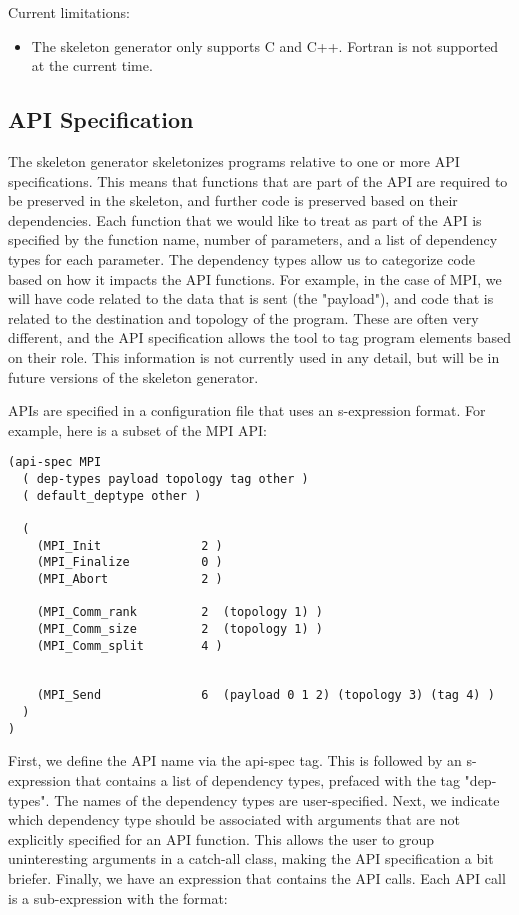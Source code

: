 \documentclass{article}
\begin{document}
Current limitations:

\begin{itemize}

\item The skeleton generator only supports C and C++.
    Fortran is not supported at the current time.

\end{itemize}

\subsection{API Specification}

The skeleton generator skeletonizes programs relative to one or more
API specifications.  This means that functions that are part of the
API are required to be preserved in the skeleton, and further code is
preserved based on their dependencies.  Each function that we would
like to treat as part of the API is specified by the function name,
number of parameters, and a list of dependency types for each
parameter.  The dependency types allow us to categorize code based on
how it impacts the API functions.  For example, in the case of MPI, we
will have code related to the data that is sent (the "payload"), and
code that is related to the destination and topology of the program.
These are often very different, and the API specification allows the
tool to tag program elements based on their role.  This information is
not currently used in any detail, but will be in future versions of
the skeleton generator.

APIs are specified in a configuration file that uses an s-expression
format.  For example, here is a subset of the MPI API:

\begin{verbatim}
(api-spec MPI
  ( dep-types payload topology tag other )
  ( default_deptype other )

  (
    (MPI_Init              2 )
    (MPI_Finalize          0 )
    (MPI_Abort             2 )

    (MPI_Comm_rank         2  (topology 1) )
    (MPI_Comm_size         2  (topology 1) )
    (MPI_Comm_split        4 )


    (MPI_Send              6  (payload 0 1 2) (topology 3) (tag 4) )
  )
)
\end{verbatim}

First, we define the API name via the api-spec tag.  This is followed
by an s-expression that contains a list of dependency types, prefaced
with the tag "dep-types".  The names of the dependency types are
user-specified.  Next, we indicate which dependency type should be
associated with arguments that are not explicitly specified for an API
function.  This allows the user to group uninteresting arguments in a
catch-all class, making the API specification a bit briefer.  Finally,
we have an expression that contains the API calls.  Each API call is a
sub-expression with the format:
\end{document}
